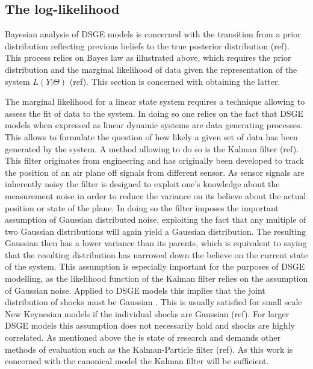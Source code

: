 \documentclass[12pt,a4paper,english]{article} %
\begin{document}
	
	\subsection{The log-likelihood}
	
	Bayesian analysis of DSGE models is concerned with the transition from a prior distribution reflecting previous beliefs to the true posterior distribution (ref). This process relies on Bayes law as illustrated above, which requires the prior distribution and the marginal likelihood of data given the representation of the system $L(Y | \Theta)$ (ref). This section is concerned with obtaining the latter.
	
	The marginal likelihood for a linear state system requires a technique allowing to assess the fit of data to the system. In doing so one relies on the fact that DSGE models when expressed as linear dynamic systems are data generating processes. This allows to formulate the question of how likely a given set of data has been generated by the system. A method allowing to do so is the Kalman filter (ref). This filter originates from engineering and has originally been developed to track the position of an air plane off signals from different sensor. As sensor signals are inherently noisy the filter is designed to exploit one's knowledge about the measurement noise in order to reduce the variance on its believe about the actual position or state of the plane. In doing so the filter imposes the important assumption of Gaussian distributed noise, exploiting the fact that any multiple of two Gaussian distributions will again yield a Gaussian distribution. The resulting Gaussian then has a lower variance than its parents, which is equivalent to saying that the resulting distribution has narrowed down the believe on the current state of the system. This assumption is especially important for the purposes of DSGE modelling, as the likelihood function of the Kalman filter relies on the assumption of Gaussian noise. Applied to DSGE models this implies that the joint distribution of shocks must be Gaussian \cite{herbst_bayesian_2016}. 
	This is usually satisfied for small scale New Keynesian models if the individual shocks are Gaussian (ref). For larger DSGE models this assumption does not necessarily hold and shocks are highly correlated. As mentioned above the is state of research and demands other methods of evaluation such as the Kalman-Particle filter (ref). As this work is concerned with the canonical model the Kalman filter will be sufficient.
	
\end{document}
